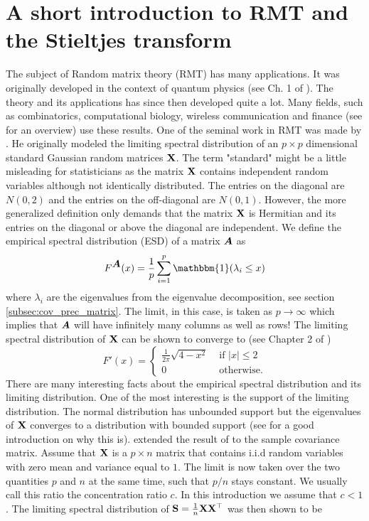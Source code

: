 \documentclass[]{book}\usepackage{knitr}
\begin{document}
\section{A short introduction to RMT and the Stieltjes transform}
The subject of Random matrix theory (RMT) has many applications. It was originally developed in the context of quantum physics (see Ch. 1 of \citet{mehta2004random}). The theory and its applications has since then developed quite a lot. Many fields, such as combinatorics, computational biology, wireless communication and finance (see \citet{REF} for an overview) use these results. One of the seminal work in RMT was made by \citet{wigner1993characteristic}. He originally modeled the limiting spectral distribution of an $p \times p$ dimensional standard Gaussian random matrices $\mathbf{X}$. The term "standard" might be a little misleading for statisticians as the matrix $\mathbf{X}$ contains independent random variables although not identically distributed. The entries on the diagonal are $N(0,2)$ and the entries on the off-diagonal are $N(0,1)$. However, the more generalized definition only demands that the matrix $\mathbf{X}$ is Hermitian and its entries on the diagonal or above the diagonal are independent. We define the empirical spectral distribution (ESD) of a matrix $\mbox{\boldmath$A$}$ as
$$
F^{\bA}(x)= \frac{1}{p} \sum_{i=1}^p \mathbbm{1}(\lambda_i \leq x)
$$ 
where $\lambda_i$ are the eigenvalues from the eigenvalue decomposition, see section \ref{subsec:cov_prec_matrix}. The limit, in this case, is taken as $p \rightarrow \infty$ which implies that $\mbox{\boldmath$A$}$ will have infinitely many columns as well as rows!
The limiting spectral distribution of $\mathbf{X}$ can be shown to converge to (see Chapter 2 of \citet{bai2010spectral})
$$
F'(x) = \begin{cases}
\frac{1}{2\pi} \sqrt{4-x^2} & \text{ if } |x|\leq 2 \\
0 & \text{ otherwise.}
\end{cases}
$$
There are many interesting facts about the empirical spectral distribution and its limiting distribution. One of the most interesting is the support of the limiting distribution. The normal distribution has unbounded support but the eigenvalues of $\mathbf{X}$ converges to a distribution with bounded support (see \citet{livan2018introduction} for a good introduction on why this is). \citet{zbMATH03244317} extended the result of \citet{wigner1993characteristic} to the sample covariance matrix. Assume that $\mathbf{X}$ is a $p \times n$ matrix that contains i.i.d random variables with zero mean and variance equal to $1$. The limit is now taken over the two quantities $p$ and $n$ at the same time, such that $p/n$ stays constant. We usually call this ratio the concentration ratio $c$. In this introduction we assume that $c<1$. The limiting spectral distribution of $\mathbf{S}=\frac{1}{n} \mathbf{X} \mathbf{X}^\top$ was then shown to be
\end{document}
